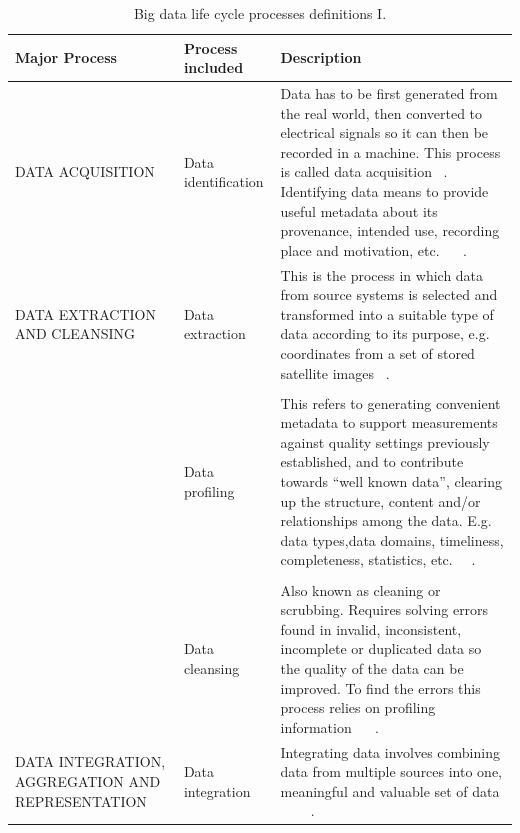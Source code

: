 \begin{table}[H]
	\caption{Big data life cycle processes definitions I.}
	\label{table:big_data_life_cyle_processes_definition_I}
	\centering
	\begin{tabular}{p{4.0cm} p{3.1cm} p{7cm}}
		\toprule
		\textbf{Major Process} & \textbf{Process included} & \textbf{Description} \\ 
		\bottomrule
		DATA ACQUISITION & Data identification & Data has to be first generated from the
		real world, then converted to electrical signals so it can then be recorded
		in a machine. This process is called data acquisition  ~\cite{ComputingResearchAssociation}. Identifying
		data means to provide useful metadata about its provenance, intended use, recording place and motivation,
		etc. ~\cite{Dataone2016} ~\cite{Microsoft2016}. \\
		DATA EXTRACTION AND CLEANSING &  Data extraction & This is the process in which data from
		source systems is selected and transformed into a suitable type of data according to its purpose, e.g. coordinates from a set of stored satellite images ~\cite{ComputingResearchAssociation}.    
		\\
		& \\ &  Data profiling & This refers to generating convenient metadata to 
		support measurements against quality settings previously established, and to contribute towards
		“well known data”, clearing up the structure, content and/or relationships among the data. E.g. data types,data domains, timeliness, completeness, statistics, etc.~\cite{Sandra2015} ~\cite{Kimball2008}.
		\\
		& \\ & Data cleansing & Also known as cleaning or scrubbing.
		Requires solving errors found in invalid, inconsistent, incomplete or duplicated data so the quality of the data
		can be improved. To find the errors this process relies on profiling information ~\cite{Sandra2015} ~\cite{Erhard2000}.
		\\ 
		DATA INTEGRATION, AGGREGATION AND REPRESENTATION & Data integration & Integrating data involves combining data from multiple sources into one,
		meaningful and valuable set of data ~\cite{Lenzerini2002} ~\cite{Halevy2006} ~\cite{Sandra2015}.
		\\
		\bottomrule
	\end{tabular}
\end{table}

